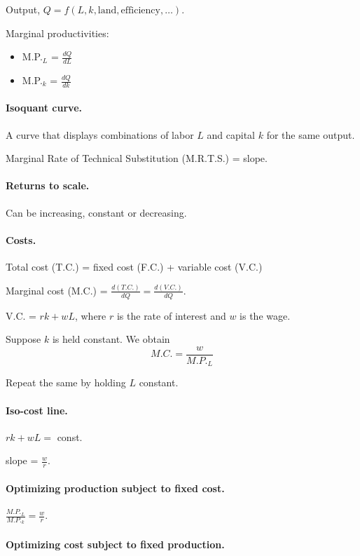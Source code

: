 \documentclass[12pt,english,oneside]{scrbook}
\numberwithin{equation}{chapter}
\theoremstyle{definition}
\theoremstyle{plain}
\begin{document}
Output, $Q = f(L, k, \text{land}, \text{efficiency}, \ldots)$.

Marginal productivities:
\begin{itemize}
\item M.P.$_L$ = $\displaystyle \frac{dQ}{dL}$
\item M.P.$_k$ = $\displaystyle \frac{dQ}{dk}$
\end{itemize}

\paragraph{Isoquant curve.}

A curve that displays combinations of labor $L$ and capital $k$ for the same output.

Marginal Rate of Technical Substitution (M.R.T.S.) = slope.

\paragraph{Returns to scale.}

Can be increasing, constant or decreasing.

\paragraph{Costs.}

Total cost (T.C.) = fixed cost (F.C.) + variable cost (V.C.)

Marginal cost (M.C.) = $\displaystyle \frac{d(T.C.)}{dQ} = \frac{d(V.C.)}{dQ}$.

V.C. = $rk + wL$, where $r$ is the rate of interest and $w$ is the wage.

Suppose $k$ is held constant. We obtain
\[
  M.C. = \frac{w}{M.P._L}
\]

Repeat the same by holding $L$ constant.

\paragraph{Iso-cost line.}

$rk + wL = $ const.

slope = $\displaystyle \frac{w}{r}$.

\paragraph{Optimizing production subject to fixed cost.}

$\displaystyle \frac{M.P._L}{M.P._k} = \frac{w}{r}$.

\paragraph{Optimizing cost subject to fixed production.}
\end{document}
